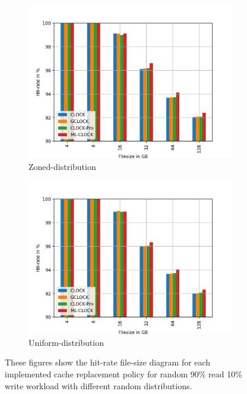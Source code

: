 \documentclass[
	12pt,
	a4paper,
	abstract,
	bibliography=totoc,
	chapterprefix,
	headings=openright,
	numbers=endperiod,
	parskip=half,
	twoside,
]{scrreprt}
\begin{document}
\begin{figure}[H]
\begin{subfigure}{0.4\textwidth}
		\includegraphics[width=\textwidth]{rw_90to10_zoned.jpg}		
		\caption{Zoned-distribution}
		\label{fig:rw_90to10  zoned}
	\end{subfigure}
	\hfill
	\begin{subfigure}{0.4\textwidth}
		\includegraphics[width=\textwidth]{rw_90to10_uniform.jpg}		
		\caption{Uniform-distribution}
		\label{fig:rw_90to10  uniform}
	\end{subfigure}
	\caption{These figures show the hit-rate file-size diagram for each implemented 		cache replacement policy for random 90\% read 10\% write workload with different random distributions.}
	\label{fig:single 90p read}
\end{figure}
\end{document}
